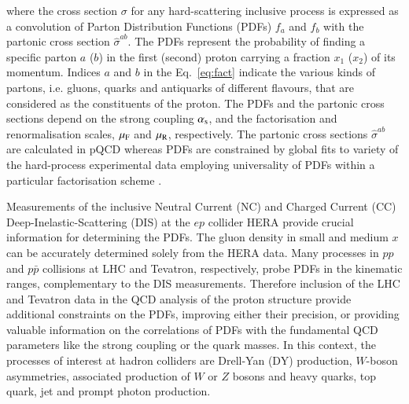 where the cross section $\sigma$ for 
any hard-scattering inclusive process
is expressed
as a convolution of Parton Distribution Functions (PDFs) $f_a$ and $f_b$
with the partonic cross section
$\hat{\sigma}^{ab}$.
%
The PDFs represent 
the probability of finding a specific parton $a$ ($b$) in the first (second) proton carrying a fraction $x_1$ ($x_2$) of its momentum.
%
Indices $a$ and $b$ in the Eq.~\ref{eq:fact} indicate the various 
kinds of partons,
i.e. gluons, quarks and antiquarks of different flavours, 
that are considered
as the constituents of the proton.
%
The PDFs and the partonic cross sections depend on the strong coupling
$\alpha_\mathrm{s}$, and the factorisation and renormalisation scales,
$\mu_\mathrm{F}$ and $\mu_\mathrm{R}$, respectively.
%
The partonic cross sections $\hat\sigma^{ab}$ are calculated in pQCD whereas
PDFs are constrained by global fits to variety of the hard-process experimental data employing
universality of PDFs within a particular factorisation scheme \cite{Perez:2012um,Forte:2013wc}. 
%
%

Measurements of the inclusive Neutral Current (NC) and Charged Current (CC)  
Deep-Inelastic-Scattering (DIS) at the $ep$ collider HERA provide crucial information for determining the PDFs.
%
The gluon density in small and medium $x$  
can be accurately determined solely from the HERA data.
%
Many processes in $pp$ and $p \bar p$ collisions at LHC and Tevatron, respectively, 
probe PDFs in the kinematic ranges, complementary to the DIS measurements.
Therefore inclusion of the LHC and Tevatron data in the QCD analysis of the proton structure 
provide additional constraints on the PDFs, improving either their precision, 
or providing valuable information on the correlations of PDFs with the fundamental 
QCD parameters like the strong coupling or the quark masses. 
%
%
In this context, the processes of interest at hadron colliders are
Drell-Yan (DY) production, $W$-boson asymmetries, associated production of $W$ or $Z$ bosons 
and heavy quarks, top quark, jet and prompt photon production.
%

